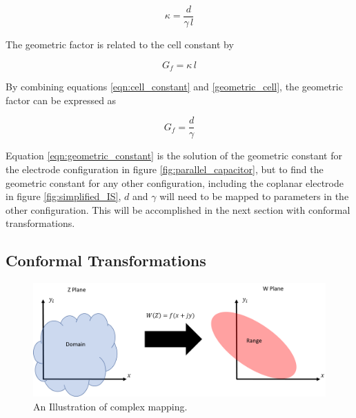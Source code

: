   \begin{equation}
      \kappa = \frac{d}{\gamma \, l}
      \label{eqn:cell_constant}
  \end{equation}
  
  \noindent The geometric factor is related to the cell constant by 
  
  \begin{equation}
       G_f = \kappa \,l
       \label{geometric_cell}
  \end{equation}

  \noindent By combining equations \ref{eqn:cell_constant} and \ref{geometric_cell}, the geometric factor can be expressed as
  
  \begin{equation}
      G_f = \frac{d}{\gamma}
      \label{eqn:geometric_constant}
  \end{equation}
  
  \par Equation \ref{eqn:geometric_constant} is the solution of the geometric constant for the electrode configuration in figure \ref{fig:parallel_capacitor}, but to find the geometric constant for any other configuration, including the coplanar electrode in figure \ref{fig:simplified_IS}, $d$ and $\gamma$ will need to be mapped to parameters in the other configuration. This will be accomplished in the next section with conformal transformations.
  
  
  \subsection{Conformal Transformations}
  
  \begin{figure}[h]
  \centering
  \includegraphics[width=\textwidth]{images/mapping.png}
  \caption[Illustration of complex mapping.]{An Illustration of complex mapping.}
  \label{fig:mapping}
  \end{figure}
  
